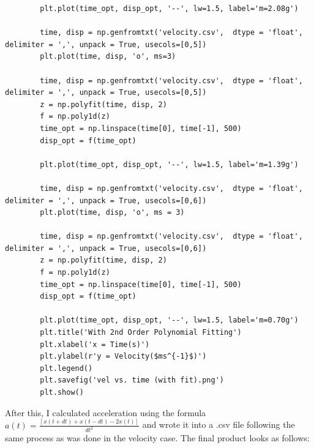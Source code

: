 \documentclass{article}
\begin{document}
\begin{lstlisting}
 		plt.plot(time_opt, disp_opt, '--', lw=1.5, label='m=2.08g')
 		
 		time, disp = np.genfromtxt('velocity.csv',  dtype = 'float', delimiter = ',', unpack = True, usecols=[0,5])
 		plt.plot(time, disp, 'o', ms=3)
 		
 		time, disp = np.genfromtxt('velocity.csv',  dtype = 'float', delimiter = ',', unpack = True, usecols=[0,5])
 		z = np.polyfit(time, disp, 2)
 		f = np.poly1d(z)
 		time_opt = np.linspace(time[0], time[-1], 500)
 		disp_opt = f(time_opt)
 		
 		plt.plot(time_opt, disp_opt, '--', lw=1.5, label='m=1.39g')
 		
 		time, disp = np.genfromtxt('velocity.csv',  dtype = 'float', delimiter = ',', unpack = True, usecols=[0,6])
 		plt.plot(time, disp, 'o', ms = 3)
 		
 		time, disp = np.genfromtxt('velocity.csv',  dtype = 'float', delimiter = ',', unpack = True, usecols=[0,6])
 		z = np.polyfit(time, disp, 2)
 		f = np.poly1d(z)
 		time_opt = np.linspace(time[0], time[-1], 500)
 		disp_opt = f(time_opt)
 		
 		plt.plot(time_opt, disp_opt, '--', lw=1.5, label='m=0.70g')
 		plt.title('With 2nd Order Polynomial Fitting')
 		plt.xlabel('x = Time(s)')
 		plt.ylabel(r'y = Velocity($ms^{-1}$)')
 		plt.legend()
 		plt.savefig('vel vs. time (with fit).png')
 		plt.show()
 	\end{lstlisting}
 
 	After this, I calculated acceleration using the formula $a(t) = \frac{[x(t+dt) + x(t-dt) - 2 x(t)]}{dt^2}$ and wrote it into a .csv file following the same process as was done in the velocity case. The final product looks as follows:
 	
\end{document}

